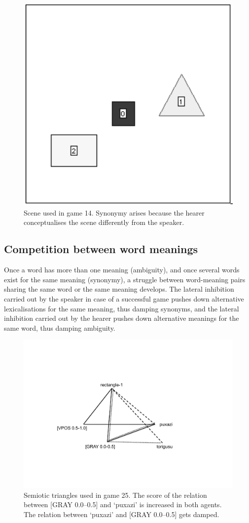 \begin{figure}[htbp]
  \centerline{\includegraphics[width=.40\textwidth]{chap6/figs/scene-game14.pdf}}
\caption{\label{scene-game14}Scene used
in game 14. Synonymy arises because the hearer conceptualises
the scene differently from the speaker.}
\end{figure}

\subsection{Competition between word meanings }

Once a word has more than one meaning (ambiguity), 
and once several words exist for the same meaning 
(synonymy), a struggle between word-meaning
pairs sharing the same word or the 
same meaning develops. The lateral inhibition carried out by the 
speaker in case of a successful game pushes
down alternative lexicalisations for the same meaning, 
thus damping synonyms, and the lateral inhibition carried out 
by the hearer pushes down alternative meanings for the 
same word, thus damping ambiguity. 


\begin{figure}[htbp]
  \centerline{\includegraphics[width=.60\textwidth]{chap6/figs/triangle5.pdf}}
\caption{\label{triangle5}Semiotic triangles used 
in game 25. The score of the relation between [GRAY 0.0–0.5] and 
`puxazi' is increased in both agents. The relation between `puxazi' and 
{}[GRAY 0.0–0.5] gets damped.}
\end{figure}

